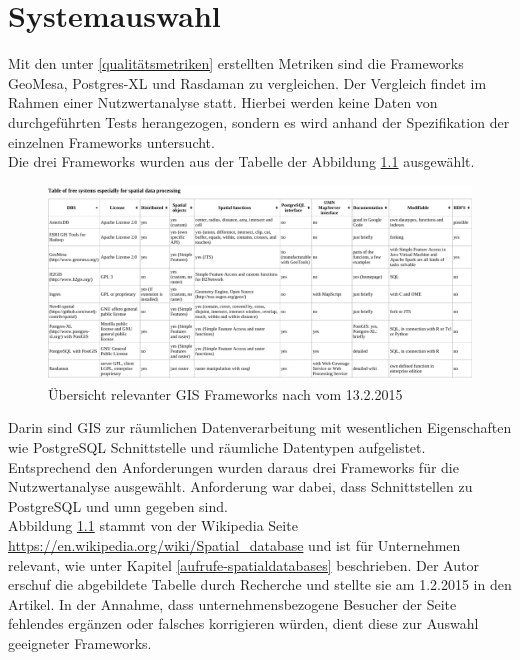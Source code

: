 \chapter{Systemauswahl}
Mit den unter \ref{qualitätsmetriken} erstellten Metriken sind die Frameworks GeoMesa, Postgres-XL und Rasdaman zu vergleichen.
Der Vergleich findet im Rahmen einer Nutzwertanalyse statt.
Hierbei werden keine Daten von durchgeführten Tests herangezogen, sondern es wird anhand der Spezifikation der einzelnen Frameworks untersucht.\\
%
Die drei Frameworks wurden aus der Tabelle der Abbildung \ref{fig:spatialdatabases} ausgewählt.
\begin{figure}
\centering
\includegraphics[angle=90,width=.66\textwidth]{Abbildungen/table_spatialdatabases_13_2_15.pdf}
\caption[Übersicht relevanter GIS Frameworks]{Übersicht relevanter GIS Frameworks nach \cite{website:wiki-spatialdatabase} vom 13.2.2015}
\label{fig:spatialdatabases}
\end{figure}
Darin sind GIS zur räumlichen Datenverarbeitung mit wesentlichen Eigenschaften wie \mbox{PostgreSQL} Schnittstelle und räumliche Datentypen aufgelistet.
Entsprechend den Anforderungen wurden daraus drei Frameworks für die Nutzwertanalyse ausgewählt.
Anforderung war dabei, dass Schnittstellen zu PostgreSQL und \Gls{umn} gegeben sind.\\
Abbildung \ref{fig:spatialdatabases} stammt von der Wikipedia Seite \url{https://en.wikipedia.org/wiki/Spatial_database} und ist für Unternehmen relevant, wie unter Kapitel \ref{aufrufe-spatialdatabases} beschrieben.
Der Autor erschuf die abgebildete Tabelle durch Recherche und stellte sie am 1.2.2015 in den Artikel.
In der Annahme, dass unternehmensbezogene Besucher der Seite fehlendes ergänzen oder falsches korrigieren würden, dient diese zur Auswahl geeigneter Frameworks.


